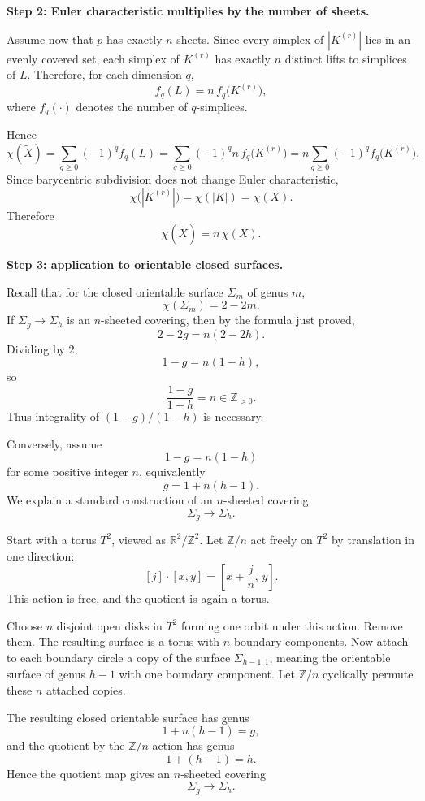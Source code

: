 \documentclass[12pt,a4paper]{article}
\theoremstyle{notespace}
\begin{document}
\medskip

\textbf{Step 2: Euler characteristic multiplies by the number of sheets.}

Assume now that \(p\) has exactly \(n\) sheets. Since every simplex of \(|K^{(r)}|\) lies in an evenly covered set, each simplex of \(K^{(r)}\) has exactly \(n\) distinct lifts to simplices of \(L\). Therefore, for each dimension \(q\),
\[
f_q(L)=n\,f_q\bigl(K^{(r)}\bigr),
\]
where \(f_q(\cdot)\) denotes the number of \(q\)-simplices.

Hence
\[
\chi(\widetilde X)
=\sum_{q\ge 0}(-1)^q f_q(L)
=\sum_{q\ge 0}(-1)^q n\,f_q\bigl(K^{(r)}\bigr)
=n\sum_{q\ge 0}(-1)^q f_q\bigl(K^{(r)}\bigr).
\]
Since barycentric subdivision does not change Euler characteristic,
\[
\chi\bigl(|K^{(r)}|\bigr)=\chi(|K|)=\chi(X).
\]
Therefore
\[
\boxed{\chi(\widetilde X)=n\,\chi(X).}
\]

\medskip

\textbf{Step 3: application to orientable closed surfaces.}

Recall that for the closed orientable surface \(\Sigma_m\) of genus \(m\),
\[
\chi(\Sigma_m)=2-2m.
\]
If \(\Sigma_g\to \Sigma_h\) is an \(n\)-sheeted covering, then by the formula just proved,
\[
2-2g=n(2-2h).
\]
Dividing by \(2\),
\[
1-g=n(1-h),
\]
so
\[
\boxed{\frac{1-g}{1-h}=n\in \mathbb Z_{>0}.}
\]
Thus integrality of \((1-g)/(1-h)\) is necessary.

Conversely, assume
\[
1-g=n(1-h)
\]
for some positive integer \(n\), equivalently
\[
g=1+n(h-1).
\]
We explain a standard construction of an \(n\)-sheeted covering
\[
\Sigma_g\to \Sigma_h.
\]

Start with a torus \(T^2\), viewed as \(\mathbb R^2/\mathbb Z^2\). Let \(\mathbb Z/n\) act freely on \(T^2\) by translation in one direction:
\[
[j]\cdot [x,y]=\left[x+\frac{j}{n},\,y\right].
\]
This action is free, and the quotient is again a torus.

Choose \(n\) disjoint open disks in \(T^2\) forming one orbit under this action. Remove them. The resulting surface is a torus with \(n\) boundary components. Now attach to each boundary circle a copy of the surface \(\Sigma_{h-1,1}\), meaning the orientable surface of genus \(h-1\) with one boundary component. Let \(\mathbb Z/n\) cyclically permute these \(n\) attached copies.

The resulting closed orientable surface has genus
\[
1+n(h-1)=g,
\]
and the quotient by the \(\mathbb Z/n\)-action has genus
\[
1+(h-1)=h.
\]
Hence the quotient map gives an \(n\)-sheeted covering
\[
\Sigma_g\to \Sigma_h.
\]
\end{document}
